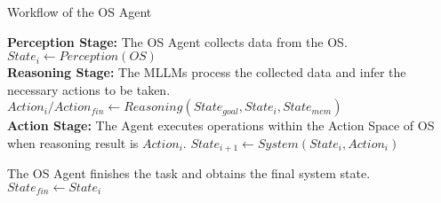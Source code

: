

\begin{algorithm}[t]
\begin{spacing}{1}
\caption{Workflow of the OS Agent}
\label{algorithm:Workflow of OS Agents}
\LinesNumbered %

 {
    \textbf{Perception Stage:} The OS Agent collects data from the OS. 
    $State_i \leftarrow Perception(OS)$ \\

    \textbf{Reasoning Stage:} The MLLMs process the collected data and infer the necessary actions to be taken. 
    $Action_i/Action_{fin} \leftarrow Reasoning(State_{goal}, State_i, State_{mem})$ \\

    \textbf{Action Stage:} The Agent executes operations within the Action Space of OS when reasoning result is $Action_i$. 
    $State_{i+1} \leftarrow System(State_i, Action_i)$ \\

}

The OS Agent finishes the task and obtains the final system state.
    $State_{fin} \leftarrow State_{i}$

\end{spacing}
\end{algorithm}